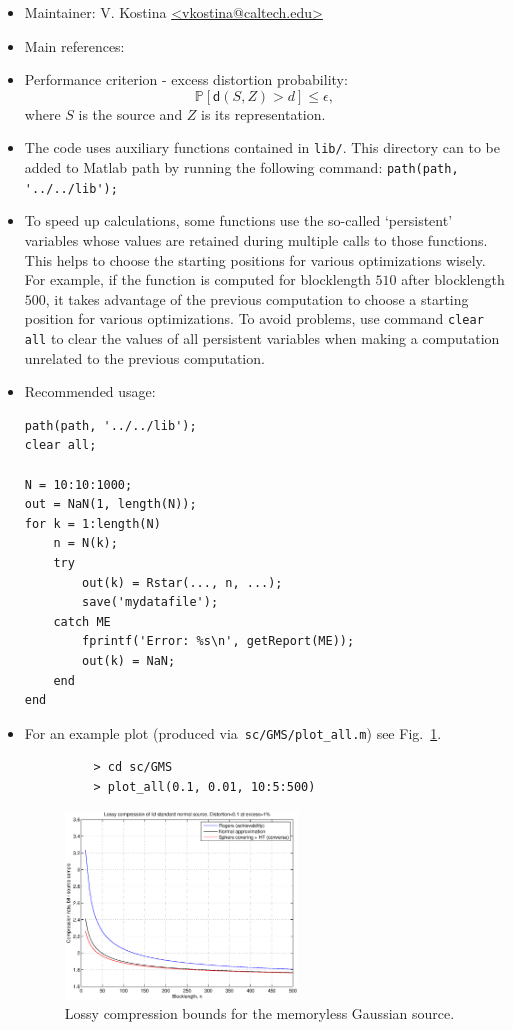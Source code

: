 \documentclass[a4paper,11p]{memoir}
\def\PP{\mathbb{P}}
\begin{document}
\begin{itemize}
\item Maintainer: V. Kostina \url{<vkostina@caltech.edu>}

\item Main references: \cite{kostina2011fixed}

\item Performance criterion - excess distortion probability: $$ \PP[ \mathsf d(S, Z) > d] \leq \epsilon,$$
where $S$ is the source and $Z$ is its representation. 


\item The code uses auxiliary functions contained in \verb|lib/|. This directory can to be added to Matlab path by running the following command: \verb|path(path, '../../lib');|

\item To speed up calculations, some functions use the so-called `persistent' variables whose values are retained during multiple calls to those functions. This helps to choose the starting positions for various optimizations wisely. For example, if the function is computed for blocklength $510$ after blocklength $500$, it takes advantage of the previous computation to choose a starting position for various optimizations. To avoid problems, use command \verb|clear all| to clear the values of all persistent variables when making a computation unrelated to the previous computation.    


\item Recommended usage: 
\begin{verbatim}
path(path, '../../lib');
clear all; 

N = 10:10:1000;
out = NaN(1, length(N));
for k = 1:length(N)
    n = N(k);  
    try
        out(k) = Rstar(..., n, ...);  
        save('mydatafile');  
    catch ME
        fprintf('Error: %s\n', getReport(ME));
        out(k) = NaN;
    end    
end
\end{verbatim}


\item For an example plot (produced via~\verb|sc/GMS/plot_all.m|) see Fig.~\ref{fig:cgms1}.
\begin{figure}
\centering
\begin{verbatim}
	> cd sc/GMS
	> plot_all(0.1, 0.01, 10:5:500)
\end{verbatim}
\includegraphics[height=5cm]{plots/compress_gms}
\caption{Lossy compression bounds for the memoryless Gaussian source.}\label{fig:cgms1}
\end{figure}

\end{itemize}
\end{document}
